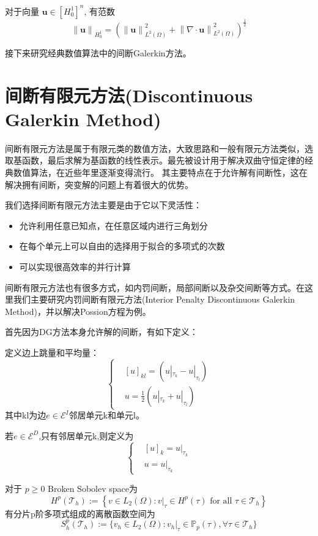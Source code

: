 对于向量 $\textbf{u}\in [H^1_0]^n$, 
有范数 $$\left\|\textbf{u}\right\|_{H^1_0}=\left(\left\|\textbf{u}\right\|^2_{L^2(\Omega)}+\left\|\nabla \cdot \textbf{u}\right\|^2_{L^2(\Omega)}\right)^{\frac{1}{2}}$$

接下来研究经典数值算法中的间断Galerkin方法。


\section{间断有限元方法(Discontinuous Galerkin Method)}\label{Interior Penalty Discontinuous Galerkin Method}
间断有限元方法\cite{DGM}是属于有限元类的数值方法，大致思路和一般有限元方法类似，选取基函数，最后求解为基函数的线性表示。最先被设计用于解决双曲守恒定律的经典数值算法，在近些年里逐渐变得流行。
其主要特点在于允许解有间断性，这在解决拥有间断，突变解的问题上有着很大的优势。

我们选择间断有限元方法主要是由于它以下灵活性：
\begin{itemize}
    \item 允许利用任意已知点，在任意区域内进行三角划分
    \item 在每个单元上可以自由的选择用于拟合的多项式的次数
    \item 可以实现很高效率的并行计算 
\end{itemize}

间断有限元方法也有很多方式，如内罚间断，局部间断以及杂交间断等方式\cite{numpde}。在这里我们主要研究内罚间断有限元方法(Interior Penalty Discontinuous Galerkin Method)，并以解决Possion方程为例。

首先因为DG方法本身允许解的间断，有如下定义：

\begin{definition}
    定义边上跳量和平均量：
    $$\left\{
    \begin{aligned}
        &[u]_{kl}=(u|_{\tau_k}-u|_{\tau_l})\\
        &{u}= \frac{1}{2}(u|_{\tau_k}+u|_{\tau_l})
    \end{aligned}
\right.$$
其中kl为边$e\in \mathscr{E}^I$邻居单元k和单元l。

若$e\in \mathscr{E}^D$,只有邻居单元k,则定义为
$$\left\{\begin{aligned}
    &[u]_{k}=u|_{\tau_k}\\
    &{u}= u|_{\tau_k}
\end{aligned}\right.$$
\end{definition}


\begin{definition}
    对于  $p \geq 0$  Broken Sobolev space为
    $$H^{p}\left(\mathscr{T}_h\right):=\left\{v \in L_{2}(\Omega): v|_{\tau} \in H^{p}\left(\tau\right) \text { for all } \tau \in \mathscr{T}_h\right\}$$
    有分片p阶多项式组成的离散函数空间为
    $$S^p_h(\mathscr{T}_h):=\{v_h\in L_2(\Omega):v_h|_{\tau}\in\mathbb{P}_p(\tau),\forall \tau \in \mathscr{T}_h\}$$
\end{definition}

